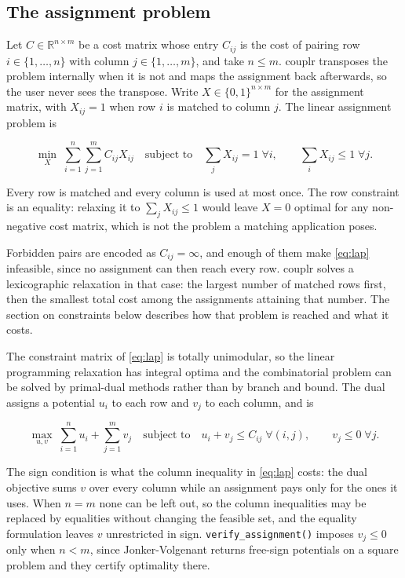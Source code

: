 \subsection{The assignment problem}\label{the-assignment-problem}

Let \(C \in \mathbb{R}^{n \times m}\) be a cost matrix whose entry \(C_{ij}\) is the
cost of pairing row \(i \in \{1, \dots, n\}\) with column \(j \in \{1, \dots, m\}\),
and take \(n \le m\). couplr transposes the problem internally when it is not and
maps the assignment back afterwards, so the user never sees the transpose.
Write \(X \in \{0,1\}^{n \times m}\) for the assignment matrix, with \(X_{ij} = 1\)
when row \(i\) is matched to column \(j\). The linear assignment problem is

\begin{equation}
\min_{X} \; \sum_{i=1}^{n} \sum_{j=1}^{m} C_{ij} X_{ij}
\quad \text{subject to} \quad
\sum_{j} X_{ij} = 1 \; \forall i, \qquad
\sum_{i} X_{ij} \le 1 \; \forall j .
\label{eq:lap}
\end{equation}

Every row is matched and every column is used at most once. The row constraint
is an equality: relaxing it to \(\sum_j X_{ij} \le 1\) would leave \(X = 0\)
optimal for any non-negative cost matrix, which is not the problem a matching
application poses.

Forbidden pairs are encoded as \(C_{ij} = \infty\), and
enough of them make \eqref{eq:lap} infeasible, since no assignment can then
reach every row. couplr solves a lexicographic relaxation in that case: the
largest number of matched rows first, then the smallest total cost among the
assignments attaining that number. The section on constraints below describes
how that problem is reached and what it costs.

The constraint matrix of \eqref{eq:lap} is totally unimodular, so the linear
programming relaxation has integral optima \citep{Birkhoff1946, Burkard1999} and the
combinatorial problem can be solved by primal-dual methods rather than by branch
and bound. The dual assigns a potential \(u_i\) to each row and \(v_j\) to each
column, and is

\begin{equation}
\max_{u, v} \; \sum_{i=1}^{n} u_i + \sum_{j=1}^{m} v_j
\quad \text{subject to} \quad
u_i + v_j \le C_{ij} \; \forall (i,j), \qquad
v_j \le 0 \; \forall j .
\label{eq:duals}
\end{equation}

The sign condition is what the column inequality in \eqref{eq:lap} costs: the
dual objective sums \(v\) over every column while an assignment pays only for the
ones it uses. When \(n = m\) none can be left out, so the column inequalities may
be replaced by equalities without changing the feasible set, and the equality
formulation leaves \(v\) unrestricted in sign. \texttt{verify\_assignment()} imposes
\(v_j \le 0\) only
when \(n < m\), since Jonker-Volgenant returns free-sign potentials on a square
problem and they certify optimality there.

